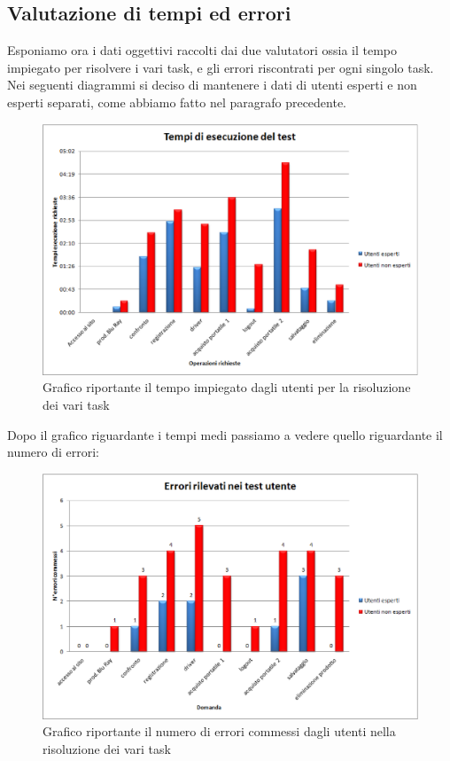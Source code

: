 \subsection*{Valutazione di tempi ed errori}
Esponiamo ora i dati oggettivi raccolti dai due valutatori ossia il tempo impiegato per risolvere i vari task, e gli errori riscontrati per ogni singolo task. Nei seguenti diagrammi si  deciso di mantenere i dati di utenti esperti e non esperti separati, come abbiamo fatto nel paragrafo precedente.


\begin{figure}[!h]
\centering
\includegraphics[angle=90, scale=0.75]{figure/grafico_tempi_esecuzione.eps}
\caption{Grafico riportante il tempo impiegato dagli utenti per la risoluzione dei vari task}
\label{fig:tempi_esecuzione_test}
\end{figure}

Dopo il grafico riguardante i tempi medi passiamo a vedere quello riguardante il numero di errori:

\begin{figure}[!h]
\centering
\includegraphics[angle=90, scale=0.75]{figure/grafico_errori_test_utente.eps}
\caption{Grafico riportante il numero di errori commessi dagli utenti nella risoluzione dei vari task}
\label{fig:errori_test}
\end{figure}


